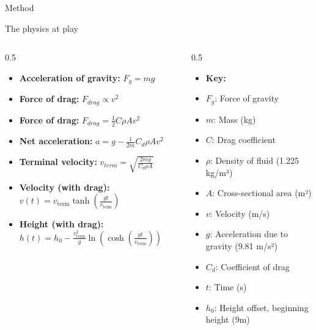 \documentclass[final]{beamer}
\newlength{\colwidth}
\begin{document}
\begin{frame}[t]
\begin{columns}[t]
\begin{column}{\colwidth}
\begin{block}{Method}
  \end{block}
\begin{alertblock}{The physics at play}
\begin{columns}[t]
\hspace{20pt} %
\begin{column}{0.5\colwidth}
\begin{itemize}
\setlength{\itemsep}{2mm}
\item
\textbf{Acceleration of gravity: } $F_g = mg$
\item
\textbf{Force of drag: } $ F_{drag} \propto v^2$ 
\item
\textbf{Force of drag: } $ F_{drag} = \frac{1}{2} C \rho Av^2$ 
\item
\textbf{Net acceleration: } $ a = g - \frac{1}{2m} C_d \rho A v^2$ 
\item
\textbf{Terminal velocity: } $ v_{term} = \sqrt{\frac{2mg}{C_d \rho A}}$ 
\item
\textbf{Velocity (with drag): } $ v(t) = v_{\text{term}} \tanh \left( \frac{gt}{v_{\text{term}}} \right)$
\item
\textbf{Height (with drag): } $ h(t) = h_0 - \frac{v_{\text{term}}^2}{g} \ln \left(\cosh \left( \frac{gt}{v_{\text{term}}}\right) \right)$
\end{itemize}
\end{column}
\hspace{10pt} %
\begin{column}{0.5\colwidth}
\vspace{-13.2pt} %
\begin{itemize}
\setlength{\itemsep}{2mm}
\item
\textbf{Key:}
\item $F_g$: Force of gravity
\item $m$: Mass (kg)
\item $C$: Drag coefficient
\item $\rho$: Density of fluid (1.225 kg/m³)
\item $A$: Cross-sectional area (m²)
\item $v$: Velocity (m/s)
\item $g$: Acceleration due to gravity (9.81 m/s²)
\item $C_d$: Coefficient of drag
\item $t$: Time (s)
\item $h_0$: Height offset, beginning height (9m)
\end{itemize}
\end{column}
\end{columns}
\
\end{alertblock}
\end{column}


\end{columns}
\end{frame}
\end{document}
